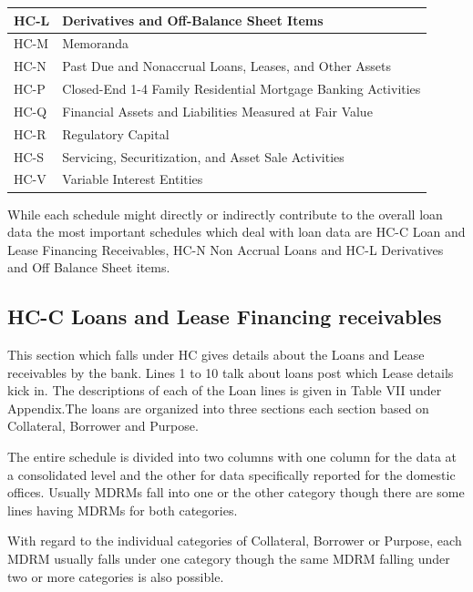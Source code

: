 \documentclass[conference]{IEEEtran}
\begin{document}
\begin{table}[htbp]
\begin{tabular}{|p{1.5cm}|p{6cm}|}
    		\hline
    		HC-L & Derivatives and Off-Balance Sheet Items \\
    		\hline
    		HC-M & Memoranda \\
    		\hline
    		HC-N & Past Due and Nonaccrual Loans, Leases, and Other Assets \\
    		\hline
    		HC-P & Closed-End 1-4 Family Residential Mortgage Banking Activities \\
    		\hline
    		HC-Q & Financial Assets and Liabilities Measured at Fair Value \\
    		\hline
    		HC-R & Regulatory Capital \\
    		\hline
    		HC-S & Servicing, Securitization, and Asset Sale Activities \\
    		\hline
    		HC-V & Variable Interest Entities \\
    		\hline
    	\end{tabular}
    \end{table}
    
    
    While each schedule might directly or indirectly contribute to the overall loan data the most important schedules which deal with loan data are HC-C Loan and Lease Financing Receivables, HC-N Non Accrual Loans and HC-L Derivatives and Off Balance Sheet items. 
    
    \subsection{HC-C Loans and Lease Financing receivables}
     This section which falls under HC gives details about the Loans and Lease receivables by the bank. Lines 1 to 10 talk about loans post which Lease details kick in. The descriptions of each of the Loan lines is given in Table VII under Appendix.The loans are organized into three sections each section based on Collateral, Borrower and Purpose.
     
     The entire schedule is divided into two columns with one column for the data at a consolidated level and the other for data specifically reported for the domestic offices. Usually MDRMs fall into one or the other category though there are some lines having MDRMs for both categories.
     
     With regard to the individual categories of Collateral, Borrower or Purpose, each MDRM usually falls under one category though the same MDRM falling under two or more categories is also possible. 
     
\end{document}
